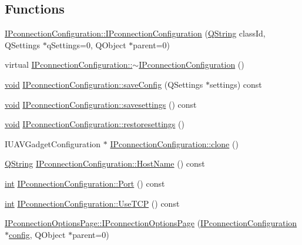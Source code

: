\subsection*{Functions}
\begin{DoxyCompactItemize}
\item 
\hyperlink{group___i_p_conn_plugin_ga0ace87181ef54adf63c246bcfa013840}{I\-Pconnection\-Configuration\-::\-I\-Pconnection\-Configuration} (\hyperlink{group___u_a_v_objects_plugin_gab9d252f49c333c94a72f97ce3105a32d}{Q\-String} class\-Id, Q\-Settings $\ast$q\-Settings=0, Q\-Object $\ast$parent=0)
\item 
virtual \hyperlink{group___i_p_conn_plugin_ga9c8548dfb0fd37208686bb5d037dfce4}{I\-Pconnection\-Configuration\-::$\sim$\-I\-Pconnection\-Configuration} ()
\item 
\hyperlink{group___u_a_v_objects_plugin_ga444cf2ff3f0ecbe028adce838d373f5c}{void} \hyperlink{group___i_p_conn_plugin_ga65bf62eee71070aef5ce1f9fe1f24322}{I\-Pconnection\-Configuration\-::save\-Config} (Q\-Settings $\ast$settings) const 
\item 
\hyperlink{group___u_a_v_objects_plugin_ga444cf2ff3f0ecbe028adce838d373f5c}{void} \hyperlink{group___i_p_conn_plugin_ga6e5d554b42d69fd06e4817ec4bece987}{I\-Pconnection\-Configuration\-::savesettings} () const 
\item 
\hyperlink{group___u_a_v_objects_plugin_ga444cf2ff3f0ecbe028adce838d373f5c}{void} \hyperlink{group___i_p_conn_plugin_gabd3e5ffc6975c4ef5389faaf21fb55c0}{I\-Pconnection\-Configuration\-::restoresettings} ()
\item 
I\-U\-A\-V\-Gadget\-Configuration $\ast$ \hyperlink{group___i_p_conn_plugin_gaf970300a500acc18095f6d50a3926529}{I\-Pconnection\-Configuration\-::clone} ()
\item 
\hyperlink{group___u_a_v_objects_plugin_gab9d252f49c333c94a72f97ce3105a32d}{Q\-String} \hyperlink{group___i_p_conn_plugin_gad855d70f2d3eee8910ee94c261e9f3cb}{I\-Pconnection\-Configuration\-::\-Host\-Name} () const 
\item 
\hyperlink{ioapi_8h_a787fa3cf048117ba7123753c1e74fcd6}{int} \hyperlink{group___i_p_conn_plugin_gaaa57ca41a00de517e859afa3c339099a}{I\-Pconnection\-Configuration\-::\-Port} () const 
\item 
\hyperlink{ioapi_8h_a787fa3cf048117ba7123753c1e74fcd6}{int} \hyperlink{group___i_p_conn_plugin_ga584108a558af4b69e0494772eb273f94}{I\-Pconnection\-Configuration\-::\-Use\-T\-C\-P} () const 
\item 
\hyperlink{group___i_p_conn_plugin_ga00a24fd6df6f9866d5b8e5eb76cd9c93}{I\-Pconnection\-Options\-Page\-::\-I\-Pconnection\-Options\-Page} (\hyperlink{class_i_pconnection_configuration}{I\-Pconnection\-Configuration} $\ast$\hyperlink{deflate_8c_a4473b5227787415097004fd39f55185e}{config}, Q\-Object $\ast$parent=0)

\end{DoxyCompactItemize}
